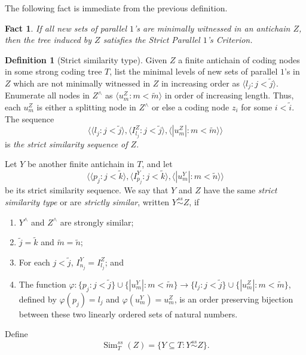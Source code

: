 \documentclass{amsart}
\newtheorem{fact}[thm]{Fact}
\theoremstyle{remark}
\theoremstyle{definition}
\newtheorem{defn}[thm]{Definition}
\theoremstyle{remark}
\newcommand{\sse}{\subseteq}
\DeclareMathOperator{\Sim}{Sim}
\newcommand{\sssim}{\stackrel{ss}{\sim}}
\newcommand{\ra}{\rightarrow}
\newcommand{\lgl}{\langle}
\newcommand{\rgl}{\rangle}
\newcommand{\SPOC}{Strict Parallel $1$'s Criterion}
\begin{document}
The following fact  is immediate from the previous definition.


\begin{fact}\label{fact.thepoint}
If  all new sets of parallel $1$'s
are minimally witnessed in an antichain $Z$,
then the tree
induced by $Z$
 satisfies  the \SPOC.
\end{fact}



\begin{defn}[Strict similarity type]\label{defn.ssimtype}
Given $Z$ a finite   antichain   of coding nodes in some strong coding tree $T$, list the minimal levels of new sets of parallel $1$'s  in $Z$  which are not minimally witnessed in $Z$
 in increasing order as $\lgl l_j: j<\tilde{j}\rgl$.
Enumerate all nodes in $Z^{\wedge}$ as $\lgl u^Z_m:m< \tilde{m}\rgl$ in order of increasing length.
Thus, each $u^Z_m$ is either a splitting node in $Z^{\wedge}$ or else  a coding node $z_i$ for some $i<\tilde{i}$.
The sequence
\begin{equation}
\lgl  \lgl l_j:j<\tilde{j}\rgl,
\lgl I^Z_{l_j}:j< \tilde{j}\rgl,
\lgl |u^Z_m|:m<\tilde{m}\rgl\rgl
\end{equation}
is  {\em  the strict similarity  sequence of $Z$}.



Let $Y$ be another finite  antichain in  $T$, and
let
\begin{equation}
\lgl
\lgl p_j:j<\tilde{k}\rgl,
\lgl I^Y_{p_j}:j< \tilde{k}\rgl,
\lgl |u^Y_m|:m<\tilde{n}\rgl\rgl
\end{equation}
be its  strict similarity  sequence.
We say that $Y$ and $Z$ have the same {\em strict similarity type} or are {\em strictly similar}, written $Y\sssim Z$, if
\begin{enumerate}
\item
$Y^{\wedge}$ and $Z^{\wedge}$ are strongly similar;
\item
$\tilde{j}=\tilde{k}$ and $\tilde{m}=\tilde{n}$;
\item
For each $j<\tilde{j}$, $I^Y_{n_j}=I^Z_{l_j}$;
and
\item
The function $\varphi:\{p_{j}:j<\tilde{j}\}\cup\{|u^Y_m|:m<\tilde{m}\}\ra \{l_{j}:j<\tilde{j}\}\cup\{|u^Z_m|:m<\tilde{m}\}$,
defined by $\varphi(p_{j})=l_{j}$ and
$\varphi(u^Y_m)=u^Z_m$,
is an order preserving bijection between these two linearly ordered sets of natural numbers.
\end{enumerate}
Define
\begin{equation}
\Sim^{ss}_T(Z)=\{Y\sse T:Y\sssim Z\}.
\end{equation}
\end{defn}
\end{document}
